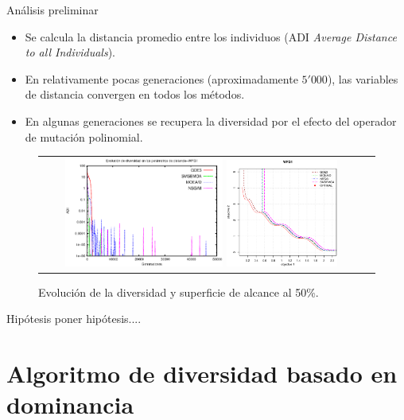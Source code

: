 \documentclass{beamer}
\begin{document}
\begin{frame}{Análisis preliminar}
\begin{itemize}
\justifying
\item Se calcula la distancia promedio entre los individuos (ADI \textit{Average Distance to all Individuals}).
\justifying
\item En relativamente pocas generaciones (aproximadamente $5'000$), las variables de distancia convergen en todos los métodos.
\justifying
\item En algunas generaciones se recupera la diversidad por el efecto del operador de mutación polinomial.
\end{itemize}
\begin{figure}
\centering
\begin{tabular}{cc}
 \includegraphics[width=0.5\textwidth]{Average_DistanceParamsStateArt.eps} 
\includegraphics[width=0.35\textwidth]{WFG1_analisis.eps} %
\end{tabular}
\caption{Evolución de la diversidad y superficie de alcance al 50\%.}
\label{fig:DiversityProposal}
\end{figure}
\end{frame}


\begin{frame}{Hipótesis}
poner hipótesis....
\end{frame}


\section{Algoritmo de diversidad basado en dominancia}
\end{document}
